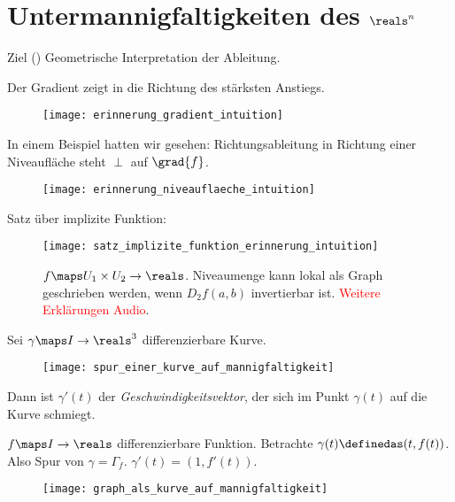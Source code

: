 \chapter{Untermannigfaltigkeiten des \texorpdfstring{\( \reals^n \)}{R\^n}}
Ziel (\ua) Geometrische Interpretation der Ableitung.
\begin{erinnerung*}
  Der Gradient zeigt in die Richtung des stärksten Anstiegs.
  \begin{figure}[H]
    \centering
    \texttt{[image: erinnerung\_gradient\_intuition]}
    \label{fig:erinnerung_gradient_intuition}
  \end{figure}
  In einem Beispiel hatten wir gesehen: Richtungsableitung in Richtung einer Niveaufläche steht \( \perp \) auf \( \grad{f} \).
  \begin{figure}[H]
    \centering
    \texttt{[image: erinnerung\_niveauflaeche\_intuition]}
    \label{fig:erinnerung_niveauflaeche_intuition}
  \end{figure}
  Satz über implizite Funktion: 
  \begin{figure}[H]
    \centering
    \texttt{[image: satz\_implizite\_funktion\_erinnerung\_intuition]}
    \caption*{\( f\maps U_1\times U_2 \to \reals \). Niveaumenge kann lokal als Graph geschrieben werden, wenn \( D_2 f(a,b) \) invertierbar ist. \textcolor{red}{Weitere Erklärungen \tto Audio}.}
    \label{fig:satz_implizite_funktion_erinnerung_intuition}
  \end{figure}
\end{erinnerung*}
\begin{aufwaermuebung*}
  Sei \( \gamma\maps I\to \reals^3 \) differenzierbare Kurve.
  \begin{figure}[H]
    \centering
    \texttt{[image: spur\_einer\_kurve\_auf\_mannigfaltigkeit]}
    \label{fig:spur_einer_kurve_auf_mannigfaltigkeit}
  \end{figure}
  Dann ist \( \gamma'(t) \) der \emph{Geschwindigkeitsvektor}, der sich im Punkt \( \gamma(t) \) auf die Kurve schmiegt.
\end{aufwaermuebung*}
\begin{beispiel*}
  \( f\maps I\to \reals \) differenzierbare Funktion. Betrachte \( \gamma(t)\definedas (t,f(t)) \). Also Spur von \( \gamma=\Gamma_f \). \( \gamma'(t)=(1,f'(t)) \).
  \begin{figure}[H]
    \centering
    \texttt{[image: graph\_als\_kurve\_auf\_mannigfaltigkeit]}
    \label{fig:graph_als_kurve_auf_mannigfaltigkeit}
  \end{figure}
\end{beispiel*}
